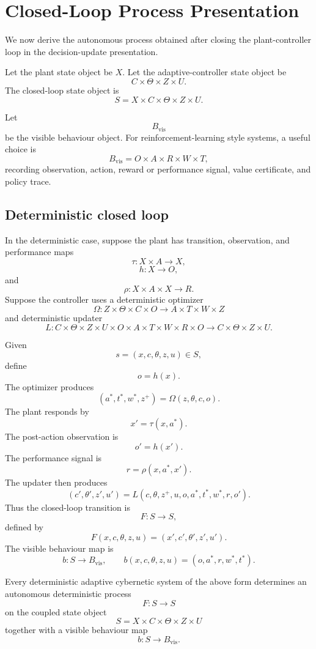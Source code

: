 \section{Closed-Loop Process Presentation}
\label{sec:closed-loop-process-presentation-effectful}

We now derive the autonomous process obtained after closing the plant-controller loop in the
decision-update presentation.

Let the plant state object be \(X\).  Let the adaptive-controller state object be
\[
C\times\Theta\times Z\times U.
\]
The closed-loop state object is
\[
S=X\times C\times\Theta\times Z\times U.
\]

Let
\[
B_{\mathrm{vis}}
\]
be the visible behaviour object.  For reinforcement-learning style systems, a useful choice is
\[
B_{\mathrm{vis}}=O\times A\times R\times W\times T,
\]
recording observation, action, reward or performance signal, value certificate, and policy trace.

\subsection{Deterministic closed loop}
\label{subsec:deterministic-closed-loop-effectful-chapter}

In the deterministic case, suppose the plant has transition, observation, and performance maps
\[
\tau:X\times A\to X,
\]
\[
h:X\to O,
\]
and
\[
\rho:X\times A\times X\to R.
\]
Suppose the controller uses a deterministic optimizer
\[
\Omega:Z\times\Theta\times C\times O\to A\times T\times W\times Z
\]
and deterministic updater
\[
L:
C\times\Theta\times Z\times U
\times O\times A\times T\times W\times R\times O
\to
C\times\Theta\times Z\times U.
\]

Given
\[
s=(x,c,\theta,z,u)\in S,
\]
define
\[
o=h(x).
\]
The optimizer produces
\[
(a^\ast,t^\ast,w^\ast,z^+)=\Omega(z,\theta,c,o).
\]
The plant responds by
\[
x'=\tau(x,a^\ast).
\]
The post-action observation is
\[
o'=h(x').
\]
The performance signal is
\[
r=\rho(x,a^\ast,x').
\]
The updater then produces
\[
(c',\theta',z',u')
=
L(c,\theta,z^+,u,o,a^\ast,t^\ast,w^\ast,r,o').
\]
Thus the closed-loop transition is
\[
F:S\to S,
\]
defined by
\[
F(x,c,\theta,z,u)=(x',c',\theta',z',u').
\]
The visible behaviour map is
\[
b:S\to B_{\mathrm{vis}},
\qquad
b(x,c,\theta,z,u)=(o,a^\ast,r,w^\ast,t^\ast).
\]

\begin{proposition}
\label{prop:closed-deterministic-cybernetic-process}
Every deterministic adaptive cybernetic system of the above form determines an autonomous
deterministic process
\[
F:S\to S
\]
on the coupled state object
\[
S=X\times C\times\Theta\times Z\times U
\]
together with a visible behaviour map
\[
b:S\to B_{\mathrm{vis}}.
\]
\end{proposition}

